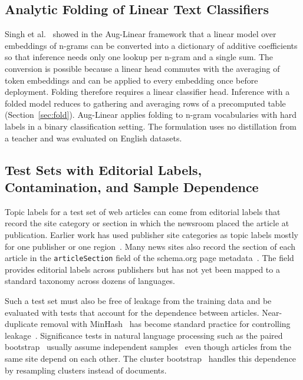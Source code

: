 \documentclass{ieeeaccess}
\begin{document}
\subsection{Analytic Folding of Linear Text Classifiers}
\label{sec:rw-fold}
Singh et al.~\cite{singh2023auglinear} showed in the Aug-Linear framework that a linear model over embeddings of n-grams can be converted into a dictionary of additive coefficients so that inference needs only one lookup per n-gram and a single sum. The conversion is possible because a linear head commutes with the averaging of token embeddings and can be applied to every embedding once before deployment. Folding therefore requires a linear classifier head. Inference with a folded model reduces to gathering and averaging rows of a precomputed table (Section~\ref{sec:fold}). Aug-Linear applies folding to n-gram vocabularies with hard labels in a binary classification setting. The formulation uses no distillation from a teacher and was evaluated on English datasets.

\subsection{Test Sets with Editorial Labels, Contamination, and Sample Dependence}
Topic labels for a test set of web articles can come from editorial labels that record the site category or section in which the newsroom placed the article at publication. Earlier work has used publisher site categories as topic labels mostly for one publisher or one region~\cite{mirashi2023indicnews}. Many news sites also record the section of each article in the \texttt{articleSection} field of the schema.org page metadata~\cite{guha2016schema}. The field provides editorial labels across publishers but has not yet been mapped to a standard taxonomy across dozens of languages.

Such a test set must also be free of leakage from the training data and be evaluated with tests that account for the dependence between articles. Near-duplicate removal with MinHash~\cite{broder1997resemblance} has become standard practice for controlling leakage~\cite{lee2022dedup}. Significance tests in natural language processing such as the paired bootstrap~\cite{koehn2004significance} usually assume independent samples~\cite{dror2018hitchhiker} even though articles from the same site depend on each other. The cluster bootstrap~\cite{field2007bootstrapping} handles this dependence by resampling clusters instead of documents.
\end{document}

